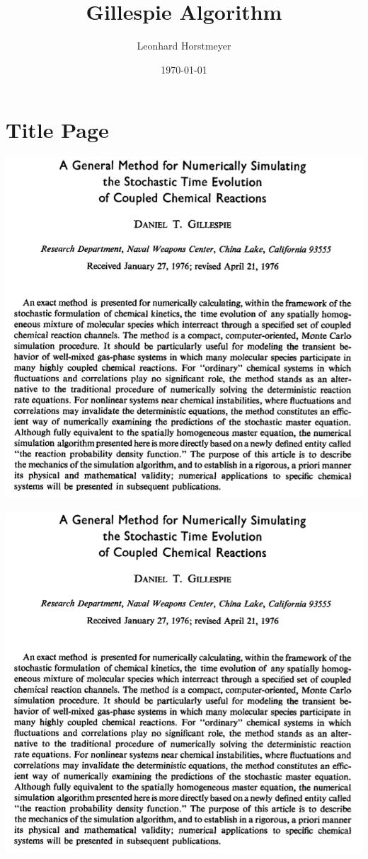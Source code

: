 \documentclass{beamer}
\begin{document}
\title{Gillespie Algorithm}  
\author{Leonhard Horstmeyer}
\date{\today} 

\frame{\titlepage} 

\section{Title Page}

\begin{frame}
\includegraphics[width=\textwidth]{originalpapercropped.png}
\end{frame}

\begin{frame}
\includegraphics[width=\textwidth]{originalpapercropped.png}
\end{frame}
\end{document}
